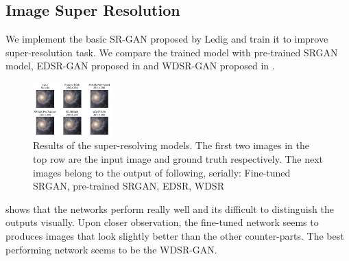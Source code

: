\documentclass[10pt,twocolumn,letterpaper]{article}
\begin{document}
    \subsection{Image Super Resolution}
    \hspace*{0.167 in}We implement the basic SR-GAN proposed by Ledig \etal \cite{ledig2017photorealistic} and train it to improve super-resolution task. We compare the trained model with pre-trained SRGAN model, EDSR-GAN proposed in \cite{lim2017enhanced} and WDSR-GAN proposed in \cite{yu2018wide}.
    \begin{figure}[!htb]
    \centering
    	\includegraphics[width=0.27\textwidth]{figures/comparison_upscale}
    	\caption{Results of the super-resolving models. The first two images in the top row are the input image and ground truth respectively. The next images belong to the output of following, serially: Fine-tuned SRGAN, pre-trained SRGAN, EDSR, WDSR}
    	\label{fig: sr_results}
    \end{figure}
     shows that the networks perform really well and its difficult to distinguish the outputs visually. Upon closer observation, the fine-tuned network seems to produces images that look slightly better than the other counter-parts. The best performing network seems to be the WDSR-GAN.
\end{document}

